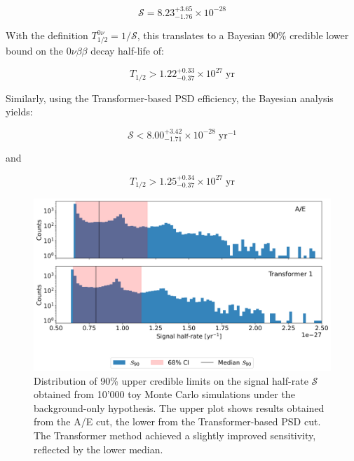 \begin{equation}
    \mathcal{S} = 8.23^{+3.65}_{-1.76} \times 10^{-28} 
\end{equation}

With the definition $T^{0 \nu}_{1/2} = 1/\mathcal{S}$, this translates to a Bayesian 90\% credible lower bound on the $0 \nu \beta \beta$ decay half-life of:

\begin{equation}
    T_{1/2} > 1.22^{+0.33}_{-0.37} \times 10^{27} \; \mathrm{yr}
\end{equation}

Similarly, using the Transformer-based PSD efficiency, the Bayesian analysis yields:

\begin{equation}
    \mathcal{S} < 8.00^{+3.42}_{-1.71} \times 10^{-28} \; \mathrm{yr}^{-1} 
\end{equation}

and

\begin{equation}
    T_{1/2} > 1.25^{+0.34}_{-0.37} \times 10^{27} \; \mathrm{yr} 
\end{equation}

\begin{figure}
\centering
\includegraphics[width=0.9\linewidth]{figures/06_sensitivity/Results_S_histogram_1000kgyr.png}
\caption{Distribution of 90\% upper credible limits on the signal half-rate $\mathcal{S}$ obtained from 10'000 toy Monte Carlo simulations under the background-only hypothesis. The upper plot shows results obtained from the A/E cut, the lower from the Transformer-based PSD cut. The Transformer method achieved a slightly improved sensitivity, reflected by the lower median. } 
\label{fig:Results_S_hist}
\end{figure}